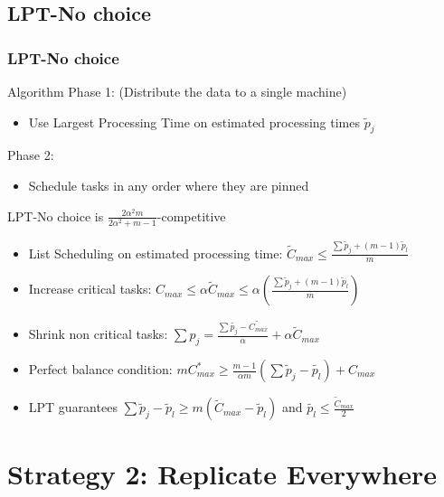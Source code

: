 \documentclass[usenames,dvipsnames]{beamer}
\begin{document}
\subsection{LPT-No choice}

\begin{frame}
  \frametitle{LPT-No choice}

  \begin{block}{Algorithm}
    Phase 1: (Distribute the data to a single machine)
    \begin{itemize}
    \item Use Largest Processing Time on estimated processing times $\tilde{p}_j$
    \end{itemize}
    Phase 2:
    \begin{itemize}
    \item Schedule tasks in any order where they are pinned
    \end{itemize}
  \end{block}

  \pause

  \begin{block}{LPT-No choice is $\frac{2\alpha^{2}m}{2\alpha^{2}+ m-1}$-competitive}
    \begin{itemize}
    \item List Scheduling on estimated processing time:
      $\tilde C_{max}\leq  \frac{\sum{\tilde p_j + (m-1) \tilde p_l} }{m}$
    \item Increase critical tasks: $C_{max}\leq \alpha \tilde C_{max}\leq \alpha \left ( \frac{\sum{\tilde p_j + (m-1) \tilde p_l} }{m} \right )$
    \item Shrink non critical tasks: $ \sum {p_j} = \frac{\sum \tilde{p_j}- \tilde{C_{max}}}{\alpha} + \alpha \tilde C_{max}$
    \item Perfect balance condition: $m C_{max}^{*}\geq \frac{m-1}{\alpha m} \left( \sum \tilde p_j - \tilde{p_l} \right) + {C_{max}}$

    \item LPT guarantees $\sum \tilde p_j-\tilde p_l \geq m (\tilde C_{max}-\tilde p_l)$ and $\tilde{p_l} \leq \frac{\tilde{C}_{max}}{2}$
    \end{itemize}
    
  \end{block}
\end{frame}

\section{Strategy 2: Replicate Everywhere}
\end{document}
